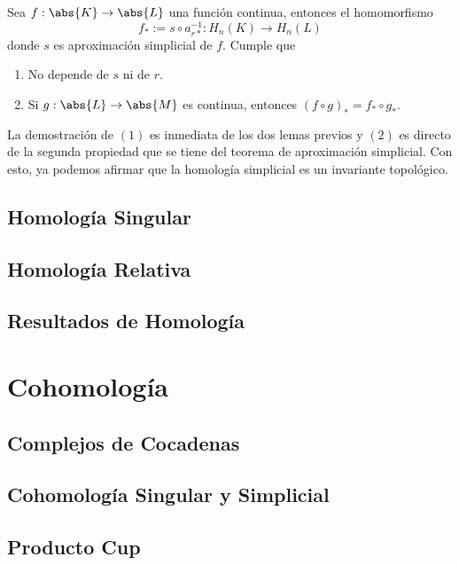 \documentclass{article}
\begin{document}
\begin{teo}
    Sea $f:\abs{K}\to\abs{L}$ una función continua, entonces el homomorfismo
    \begin{equation*}
        f_{*}:=s\circ a_{r*}^{-1}:H_{n}(K)\to H_{n}(L)
    \end{equation*}
    donde $s$ es aproximación simplicial de $f$. Cumple que
    \begin{enumerate}
        \item No depende de $s$ ni de $r$.
        \item Si $g:\abs{L}\to\abs{M}$ es continua, entonces $(f\circ g)_{*}=f_{*}\circ g_{*}$.
    \end{enumerate}
\end{teo}
\noindent La demostración de $(1)$ es inmediata de los dos lemas previos y $(2)$ es directo de la
segunda propiedad que se tiene del teorema de aproximación simplicial. Con esto, ya podemos 
afirmar que la homología simplicial es un invariante topológico.

\newpage
\subsection{Homología Singular}

\newpage
\subsection{Homología Relativa}

\newpage
\subsection{Resultados de Homología}

\newpage
\section{Cohomología}

\subsection{Complejos de Cocadenas}

\newpage
\subsection{Cohomología Singular y Simplicial}

\newpage
\subsection{Producto Cup}
\end{document}
